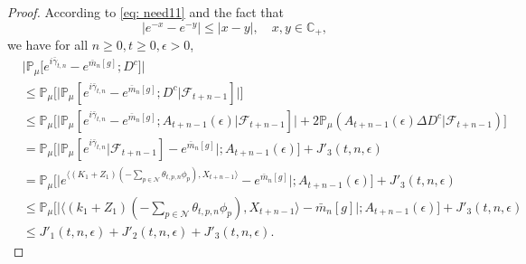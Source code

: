 \documentclass[12pt,a4paper]{amsart}
\theoremstyle{plain}
\theoremstyle{definition}
\numberwithin{equation}{section}
\begin{document}
\begin{proof}
    According to \eqref{eq: need11} and the fact that
\[
	|e^{-x} - e^{-y}| \leq |x-y|,\quad x,y \in \mathbb C_+,
\]
    we have for all $n\geq 0, t\geq 0, \epsilon> 0$, 
\begin{align}
\label{eq: inequality that will used later1}
    &\big|\mathbb{P}_{\mu}\big[e^{i\bar{\gamma}_{t,n}}-e^{\bar{m}_n[g]}; D^c\big]\big|
    \\& \leq \mathbb{P}_{\mu}\Big[\big| \mathbb{P}_{\mu}[e^{i\bar{\gamma}_{t,n}}-e^{\bar{m}_n[g]}; D^c | \mathscr F_{t+n-1}]\big|\Big]
    \\& \leq \mathbb{P}_{\mu}\Big[\big| \mathbb{P}_{\mu}[e^{i\bar{\gamma}_{t,n}}-e^{\bar{m}_n[g]}; A_{t+n-1}(\epsilon)| \mathscr F_{t+n-1}]\big| + 2\mathbb P_\mu(A_{t+n-1}(\epsilon) \Delta D^c| \mathscr F_{t+n-1})\Big]
    \\& = \mathbb{P}_{\mu}\Big[ \big|\mathbb{P}_{\mu}[e^{i\bar{\gamma}_{t,n}}| \mathscr F_{t+n-1}]-e^{\bar{m}_n[g]}\big|;A_{t+n-1}(\epsilon)\Big] + J'_3(t,n,\epsilon)
    \\&=\mathbb{P}_{\mu}\Big[\big|e^{\langle (K_1+Z_1)(-\sum_{p\in \mathcal{N}}\theta_{t,p,n}\phi_p), X_{t+n-1}\rangle}-e^{\bar{m}_n[g]}\big|;A_{t+n-1}(\epsilon)\Big]+ J'_3(t,n,\epsilon)
    \\&\leq \mathbb{P}_{\mu}\Big[\big|\langle (k_1+Z_1)(-\sum_{p\in \mathcal{N}}\theta_{t,p,n}\phi_p), X_{t+n-1}\rangle-\bar{m}_n[g]\big|;A_{t+n-1}(\epsilon)\Big]+ J'_3(t,n,\epsilon)
    \\&\leq J'_1(t,n,\epsilon)+J'_2(t,n,\epsilon)+J'_3(t,n,\epsilon).
\end{align}


\end{proof}
\end{document}
